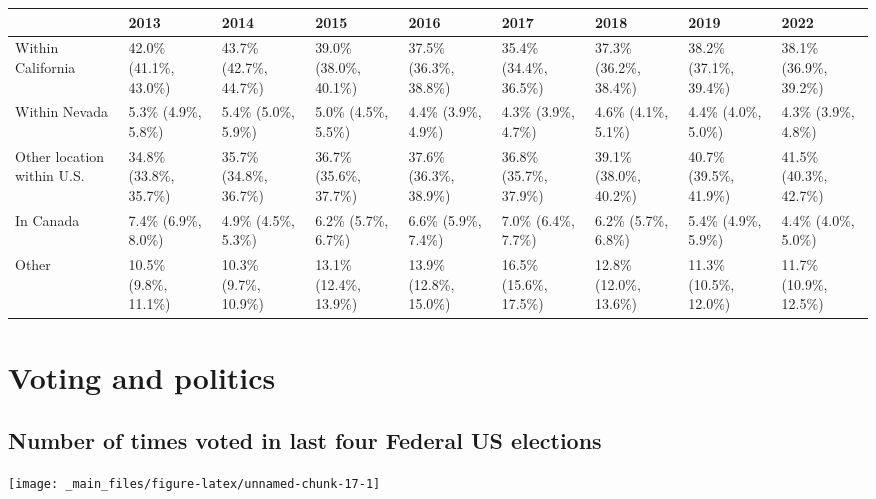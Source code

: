 \documentclass[
]{book}
\begin{document}
\begin{table}
\centering
\begin{tabular}[t]{>{}l|>{}l|>{}l|>{}l|>{}l|>{}l|>{}l|>{}l|>{}l}
\hline
  & 2013 & 2014 & 2015 & 2016 & 2017 & 2018 & 2019 & 2022\\
\hline
Within California & 42.0\% (41.1\%, 43.0\%) & 43.7\% (42.7\%, 44.7\%) & 39.0\% (38.0\%, 40.1\%) & 37.5\% (36.3\%, 38.8\%) & 35.4\% (34.4\%, 36.5\%) & 37.3\% (36.2\%, 38.4\%) & 38.2\% (37.1\%, 39.4\%) & 38.1\% (36.9\%, 39.2\%)\\
\hline
Within Nevada & 5.3\% (4.9\%, 5.8\%) & 5.4\% (5.0\%, 5.9\%) & 5.0\% (4.5\%, 5.5\%) & 4.4\% (3.9\%, 4.9\%) & 4.3\% (3.9\%, 4.7\%) & 4.6\% (4.1\%, 5.1\%) & 4.4\% (4.0\%, 5.0\%) & 4.3\% (3.9\%, 4.8\%)\\
\hline
Other location within U.S. & 34.8\% (33.8\%, 35.7\%) & 35.7\% (34.8\%, 36.7\%) & 36.7\% (35.6\%, 37.7\%) & 37.6\% (36.3\%, 38.9\%) & 36.8\% (35.7\%, 37.9\%) & 39.1\% (38.0\%, 40.2\%) & 40.7\% (39.5\%, 41.9\%) & 41.5\% (40.3\%, 42.7\%)\\
\hline
In Canada & 7.4\% (6.9\%, 8.0\%) & 4.9\% (4.5\%, 5.3\%) & 6.2\% (5.7\%, 6.7\%) & 6.6\% (5.9\%, 7.4\%) & 7.0\% (6.4\%, 7.7\%) & 6.2\% (5.7\%, 6.8\%) & 5.4\% (4.9\%, 5.9\%) & 4.4\% (4.0\%, 5.0\%)\\
\hline
Other & 10.5\% (9.8\%, 11.1\%) & 10.3\% (9.7\%, 10.9\%) & 13.1\% (12.4\%, 13.9\%) & 13.9\% (12.8\%, 15.0\%) & 16.5\% (15.6\%, 17.5\%) & 12.8\% (12.0\%, 13.6\%) & 11.3\% (10.5\%, 12.0\%) & 11.7\% (10.9\%, 12.5\%)\\
\hline
\end{tabular}
\end{table}

\hypertarget{voting-and-politics}{%
\section{Voting and politics}\label{voting-and-politics}}

\hypertarget{number-of-times-voted-in-last-four-federal-us-elections}{%
\subsection{Number of times voted in last four Federal US elections}\label{number-of-times-voted-in-last-four-federal-us-elections}}

\texttt{[image: \_main\_files/figure-latex/unnamed-chunk-17-1]}
\end{document}
